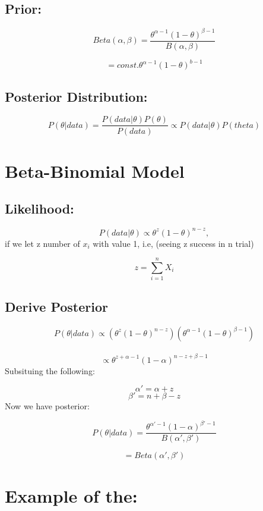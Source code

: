 \documentclass[
]{book}
\begin{document}
\hypertarget{prior}{%
\subsection{Prior:}\label{prior}}

\[Beta(\alpha,\beta) = \frac{\theta^{\alpha-1}(1-\theta)^{\beta-1}}{B(\alpha,\beta)}\]

\[= const.\theta^{\alpha-1}(1-\theta)^{b-1}\]

\hypertarget{posterior-distribution}{%
\subsection{Posterior Distribution:}\label{posterior-distribution}}

\[P(\theta|data)=\frac{P(data|\theta)P(\theta)}{P(data)}\propto P(data|\theta)P(theta)\]

\hypertarget{beta-binomial-model}{%
\section{Beta-Binomial Model}\label{beta-binomial-model}}

\hypertarget{likelihood}{%
\subsection{Likelihood:}\label{likelihood}}

\[P(data|\theta) \propto \theta^z(1-\theta)^{n-z},\]
if we let z number of \(x_{i}\) with value 1, i.e, (seeing z success in n trial)

\[z=\sum_{i=1}^{n}X_i\]

\hypertarget{derive-posterior}{%
\subsection{Derive Posterior}\label{derive-posterior}}

\[P(\theta|data) \propto ( \theta^z(1-\theta)^{n-z})(\theta^{\alpha-1}(1-\theta)^{\beta-1})\]\\
\[\propto \theta^{z+\alpha-1}(1-\alpha)^{n-z+\beta-1}\]
Subsituing the following:

\[\alpha'=\alpha + z\]
\[\beta'=n+\beta-z\]
Now we have posterior:

\[P(\theta | data) = \frac{\theta^{\alpha'-1}(1-\alpha)^{\beta'-1}}{B(\alpha',\beta')}\]

\[=Beta(\alpha',\beta')\]

\hypertarget{example-of-the}{%
\section{Example of the:}\label{example-of-the}}
\end{document}
